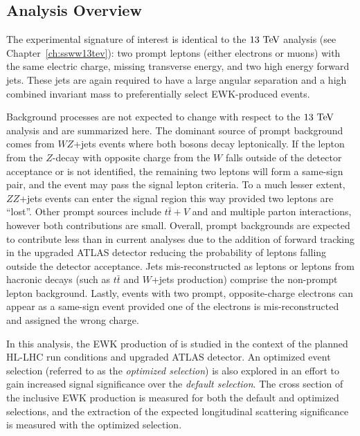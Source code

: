 \subsection{Analysis Overview}
The experimental signature of interest is identical to the $13\tev$ analysis (see Chapter~\ref{ch:ssww13tev}): two prompt leptons (either electrons or muons) with the same electric charge, missing transverse energy, and two high energy forward jets.
These jets are again required to have a large angular separation and a high combined invariant mass to preferentially select EWK-produced \ssww events.

Background processes are not expected to change with respect to the $13\tev$ analysis and are summarized here. %
The dominant source of prompt background comes from $WZ$+jets events where both bosons decay leptonically.  
If the lepton from the $Z$-decay with opposite charge from the $W$ falls outside of the detector acceptance or is not identified, the remaining two leptons will form a same-sign pair, and the event may pass the signal lepton criteria.
To a much lesser extent, $ZZ$+jets events can enter the signal region this way provided two leptons are ``lost''.
Other prompt sources include $t\bar{t}+V$ and and multiple parton interactions, however both contributions are small.
Overall, prompt backgrounds are expected to contribute less than in current analyses due to the addition of forward tracking in the upgraded ATLAS detector reducing the probability of leptons falling outside the detector acceptance.
Jets mis-reconstructed as leptons or leptons from hacronic decays (such as $t\bar{t}$ and $W$+jets production) comprise the non-prompt lepton background.
Lastly, events with two prompt, opposite-charge electrons can appear as a same-sign event provided one of the electrons is mis-reconstructed and assigned the wrong charge.

In this analysis, the EWK production of \ssww is studied in the context of the planned HL-LHC run conditions and upgraded ATLAS detector.
An optimized event selection (referred to as the \emph{optimized selection}) is also explored in an effort to gain increased signal significance over the \emph{default selection}. %
The cross section of the inclusive EWK production is measured for both the default and optimized selections, and the extraction of the expected longitudinal scattering significance is measured with the optimized selection.
